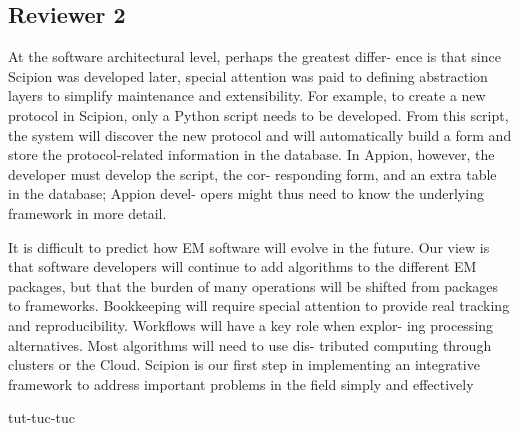 \documentclass[a4paper,12pt]{article}
\begin{document}
\begin{reviewer}
\section*{Reviewer 2}


\reply At the software architectural level, perhaps the greatest differ-
ence is that since Scipion was developed later, special attention
was paid to defining abstraction layers to simplify maintenance
and extensibility. For example, to create a new protocol in Scipion,
only a Python script needs to be developed. From this script, the
system will discover the new protocol and will automatically build
a form and store the protocol-related information in the database.
In Appion, however, the developer must develop the script, the cor-
responding form, and an extra table in the database; Appion devel-
opers might thus need to know the underlying framework in more
detail.

It is difficult to predict how EM software will evolve in the
future. Our view is that software developers will continue to add
algorithms to the different EM packages, but that the burden of
many operations will be shifted from packages to frameworks.
Bookkeeping will require special attention to provide real tracking
and reproducibility. Workflows will have a key role when explor-
ing processing alternatives. Most algorithms will need to use dis-
tributed computing through clusters or the Cloud. Scipion is our
first step in implementing an integrative framework to address
important problems in the field simply and effectively


\reply tut-tuc-tuc 




\end{reviewer}
\end{document}
